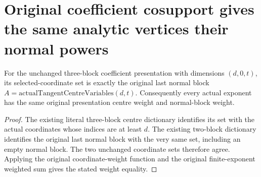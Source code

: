 \section{Original coefficient cosupport gives the same analytic vertices their normal powers}

\begin{theorem}
\label{hir:actual-vertex-coefficient-zero-middle-centre}
For the unchanged three-block coefficient presentation with dimensions
$(d,0,t)$, its selected-coordinate set is exactly the original last
normal block $A=\mathrm{actualTangentCentreVariables}(d,t)$.
Consequently every actual exponent has the same original presentation
centre weight and normal-block weight.
\leanok
\end{theorem}
\begin{proof}
The existing literal three-block centre dictionary identifies its set
with the actual coordinates whose indices are at least $d$.
The existing two-block dictionary identifies the original last normal
block with the very same set, including an empty normal block.
The two unchanged coordinate sets therefore agree. Applying the
original coordinate-weight function and the original finite-exponent
weighted sum gives the stated weight equality.
\end{proof}

